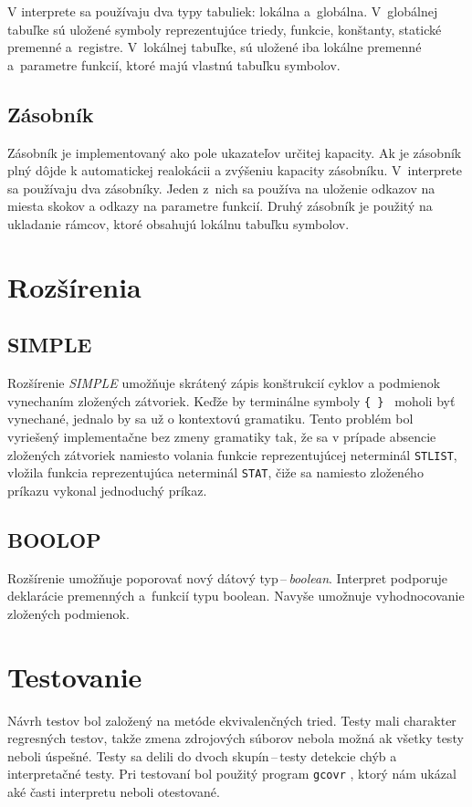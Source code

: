 \documentclass[11pt,a4paper]{article}
\begin{document}
        V interprete sa používaju dva typy tabuliek: lokálna a~globálna. V~globálnej
        tabuľke sú uložené symboly reprezentujúce triedy, funkcie, konštanty, statické
        premenné a~registre. V~lokálnej tabuľke, sú uložené iba lokálne premenné a~parametre
        funkcií, ktoré majú vlastnú tabuľku symbolov.

        \subsection{Zásobník}
        Zásobník je implementovaný ako pole ukazateľov určitej kapacity. Ak je zásobník
        plný dôjde k automatickej realokácii a zvýšeniu kapacity zásobníku.
        V~interprete sa používaju dva zásobníky. Jeden z~nich sa používa na uloženie
        odkazov na miesta skokov a odkazy na parametre funkcií. Druhý zásobník je
        použitý na ukladanie rámcov, ktoré obsahujú lokálnu tabuľku symbolov.

\section{Rozšírenia}
\label{rozsirenia}

    \subsection{SIMPLE}
    Rozšírenie \emph{SIMPLE} umožňuje skrátený zápis konštrukcií cyklov a
    podmienok vynechaním zložených zátvoriek. Keďže by terminálne symboly
    \texttt{\{ \} } moholi byť vynechané, jednalo by sa už o kontextovú gramatiku.
    Tento problém bol vyriešený implementačne bez zmeny
    gramatiky tak, že sa v prípade absencie zložených zátvoriek namiesto volania
    funkcie reprezentujúcej neterminál \texttt{STLIST}, vložila
    funkcia reprezentujúca neterminál \texttt{STAT}, čiže sa namiesto zloženého
    príkazu vykonal jednoduchý príkaz.

    \subsection{BOOLOP}
    Rozšírenie umožňuje poporovať nový dátový typ\,--\,\emph{boolean}. Interpret
    podporuje deklarácie premenných a~funkcií typu boolean. Navyše
    umožnuje vyhodnocovanie zložených podmienok.

\section{Testovanie}
\label{testovanie}
Návrh testov bol založený na metóde ekvivalenčných tried. Testy mali charakter
regresných testov, takže zmena zdrojových súborov nebola možná ak
všetky testy neboli úspešné. Testy sa delili do dvoch skupín\,--\,testy
detekcie chýb a interpretačné testy. Pri testovaní bol použitý program
\texttt{gcovr} \cite{COV}, ktorý nám ukázal aké časti interpretu neboli otestované.
\end{document}

